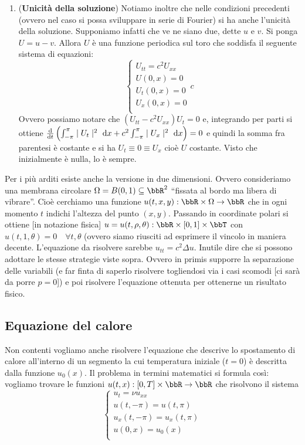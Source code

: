 \documentclass[a4paper,NoNotes,GeneralMath]{stdmdoc}
\newcommand{\intpie}{\int_{-\pi}^\pi }
\begin{document}
\begin{enumerate}
        \item ({\bf Unicità della soluzione}) Notiamo inoltre che nelle condizioni precedenti (ovvero nel caso si possa sviluppare in serie di Fourier) si ha anche l'unicità della soluzione. Supponiamo infatti che ve ne siano due, dette $u$ e $v$. Si ponga $U = u - v$. Allora $U$ è una funzione periodica sul toro che soddisfa il seguente sistema di equazioni: $$ \left\{ \begin{array}{c} U_{tt} = c^2 U_{xx} \\ U(0,x) = 0 \\ U_t(0, x) = 0 \\ U_x(0, x) = 0 \\ \end{array}{c} \right. $$
          Ovvero possiamo notare che $(U_{tt} - c^2 U_{xx}) U_t = 0$ e, integrando per parti si ottiene $\de{}{t} \left( \intpie \abs{U_t}^2 \de x + c^2 \intpie \abs{U_x}^2 \de x \right) = 0$ e quindi la somma fra parentesi è costante e si ha $U_t \equiv 0 \equiv U_x$ cioè $U$ costante. Visto che inizialmente è nulla, lo è sempre.
        \end{enumerate}

        Per i più arditi esiste anche la versione in due dimensioni. Ovvero consideriamo una membrana circolare $\Omega = B(0, 1) \subseteq \bbR^2$ ``fissata al bordo ma libera di vibrare''. Cioè cerchiamo una funzione $u(t, x, y): \bbR \times \Omega \rar \bbR$ che in ogni momento $t$ indichi l'altezza del punto $(x, y)$. Passando in coordinate polari si ottiene [in notazione fisica] $u = u(t, \rho, \theta): \bbR \times [0, 1] \times \bbT$ con $u(t, 1, \theta) = 0 \quad \forall t, \theta$ (ovvero siamo riusciti ad esprimere il vincolo in maniera decente. L'equazione da risolvere sarebbe $u_{tt} = c^2 \Delta u$. Inutile dire che si possono adottare le stesse strategie viste sopra. Ovvero in primis supporre la separazione delle variabili (e far finta di saperlo risolvere togliendosi via i casi scomodi [ci sarà da porre $p = 0$]) e poi risolvere l'equazione ottenuta per ottenerne un risultato fisico.

        \subsection*{Equazione del calore}
        Non contenti vogliamo anche risolvere l'equazione che descrive lo spostamento di calore all'interno di un segmento la cui temperatura iniziale ($t = 0$) è descritta dalla funzione $u_0(x)$. Il problema in termini matematici si formula così: vogliamo trovare le funzioni $u(t, x): [0, T] \times \bbR \rar \bbR$ che risolvono il sistema $$\left\{ \begin{array}{c} u_t = \nu u_{xx} \\ u(t, -\pi) = u(t, \pi) \\ u_x(t, -\pi) = u_x(t, \pi) \\ u(0, x) = u_0(x) \\ \end{array} \right. $$
\end{document}
